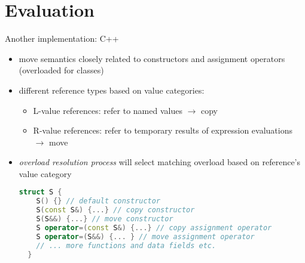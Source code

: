 \documentclass{beamer}
\begin{document}



\section{Evaluation}

\begin{frame}[fragile]{Another implementation: C++}
\begin{itemize}
  \item move semantics closely related to constructors and assignment operators (overloaded for classes)
  \item different reference types based on value categories:
  \begin{itemize}
    \item L-value references: refer to named values $\rightarrow$ copy
    \item R-value references: refer to temporary results of expression evaluations $\rightarrow$ move
  \end{itemize}
  \item \emph{overload resolution process} will select matching overload based on reference's value category
  \begin{lstlisting}[language=C++]
  struct S {
    S() {} // default constructor
    S(const S&) {...} // copy constructor
    S(S&&) {...} // move constructor
    S operator=(const S&) {...} // copy assignment operator
    S operator=(S&&) {... } // move assignment operator
    // ... more functions and data fields etc.
  }
  \end{lstlisting}
\end{itemize}
\end{frame}
\end{document}
